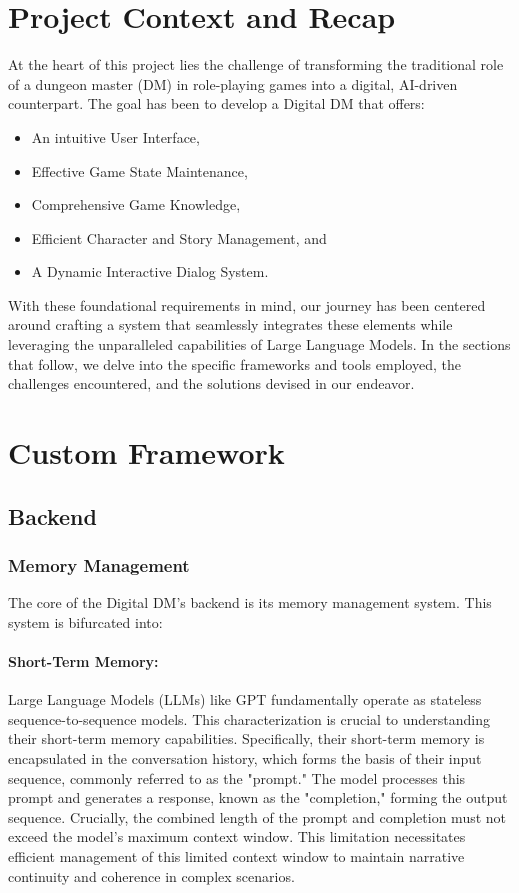 \documentclass[letterpaper]{article}
\begin{document}
\section{Project Context and Recap}
At the heart of this project lies the challenge of transforming the traditional role of a dungeon master (DM) in role-playing games into a digital, AI-driven counterpart. The goal has been to develop a Digital DM that offers:
\begin{itemize}
\item An intuitive User Interface,
\item Effective Game State Maintenance,
\item Comprehensive Game Knowledge,
\item Efficient Character and Story Management, and
\item A Dynamic Interactive Dialog System.
\end{itemize}
With these foundational requirements in mind, our journey has been centered around crafting a system that seamlessly integrates these elements while leveraging the unparalleled capabilities of Large Language Models. In the sections that follow, we delve into the specific frameworks and tools employed, the challenges encountered, and the solutions devised in our endeavor.

\section{Custom Framework}

\subsection{Backend}

\subsubsection{Memory Management}
The core of the Digital DM's backend is its memory management system. This system is bifurcated into:

\paragraph{Short-Term Memory:}
Large Language Models (LLMs) like GPT fundamentally operate as stateless sequence-to-sequence models. This characterization is crucial to understanding their short-term memory capabilities. Specifically, their short-term memory is encapsulated in the conversation history, which forms the basis of their input sequence, commonly referred to as the "prompt." The model processes this prompt and generates a response, known as the "completion," forming the output sequence. Crucially, the combined length of the prompt and completion must not exceed the model's maximum context window. This limitation necessitates efficient management of this limited context window to maintain narrative continuity and coherence in complex scenarios.
\end{document}
